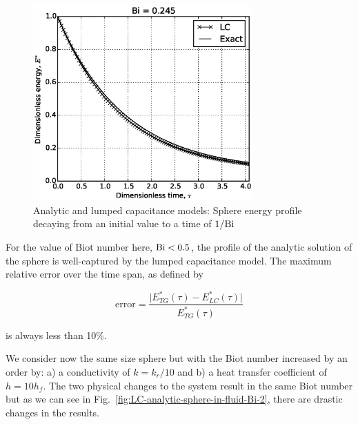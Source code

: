 \begin{figure}[ht]
	\centering
		\includegraphics[width=0.75\textwidth]{chapters/figures/LC-analytic-sphere-in-fluid}
	\caption[Analytic temperature profile for $\Bi < 1$]{Analytic and lumped capacitance models: Sphere energy profile decaying from an initial value to a time of $1/\mathrm{Bi}$}
	\label{fig:LC-analytic-sphere-in-fluid}
\end{figure}

For the value of Biot number here, $\mathrm{Bi} < 0.5$, the profile of the analytic solution of the sphere is well-captured by the lumped capacitance model. The maximum relative error over the time span, as defined by

\begin{equation}\label{eq:error}
	\text{error} = \frac{\big|E^*_{TG}(\tau) - E^*_{LC}(\tau) \big|}{E^*_{TG}(\tau)}
\end{equation}

is always less than 10\%. 

We consider now the same size sphere but with the Biot number increased by an order by: a) a conductivity of $k = k_r/10$ and b) a heat transfer coefficient of $h = 10h_f$. The two physical changes to the system result in the same Biot number but as we can see in Fig.~\ref{fig:LC-analytic-sphere-in-fluid-Bi-2}, there are drastic changes in the results. 

